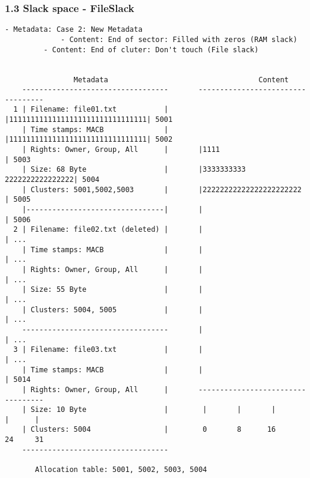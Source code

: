 \begin{frame}[fragile]
  \frametitle{1.3 Slack space - FileSlack}
  \begin{lstlisting}[basicstyle=\tiny\ttfamily]
             - Metadata: Case 2: New Metadata
             - Content: End of sector: Filled with zeros (RAM slack)
	     - Content: End of cluter: Don't touch (File slack)
                            

                Metadata                                   Content     
    ----------------------------------       ----------------------------------
  1 | Filename: file01.txt           |       |11111111111111111111111111111111| 5001
    | Time stamps: MACB              |       |11111111111111111111111111111111| 5002
    | Rights: Owner, Group, All      |       |1111                            | 5003
    | Size: 68 Byte                  |       |3333333333      2222222222222222| 5004
    | Clusters: 5001,5002,5003       |       |22222222222222222222222         | 5005
    |--------------------------------|       |                                | 5006
  2 | Filename: file02.txt (deleted) |       |                                | ...
    | Time stamps: MACB              |       |                                | ...
    | Rights: Owner, Group, All      |       |                                | ...
    | Size: 55 Byte                  |       |                                | ...
    | Clusters: 5004, 5005           |       |                                | ...
    ----------------------------------       |                                | ...
  3 | Filename: file03.txt           |       |                                | ...
    | Time stamps: MACB              |       |                                | 5014
    | Rights: Owner, Group, All      |       ----------------------------------
    | Size: 10 Byte                  |        |       |       |       |      |
    | Clusters: 5004                 |        0       8      16      24     31
    ----------------------------------

       Allocation table: 5001, 5002, 5003, 5004
  \end{lstlisting}
\end{frame}


